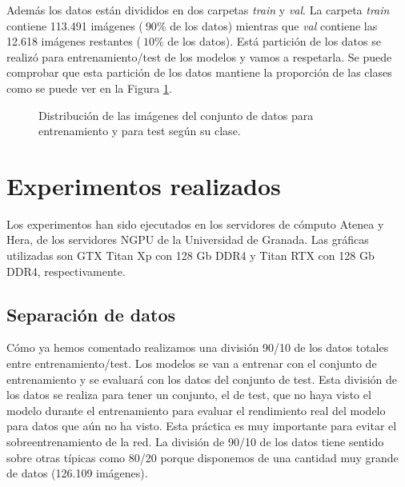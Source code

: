 Además los datos están divididos en dos carpetas \textit{train} y \textit{val}. La carpeta \textit{train} contiene 113.491 imágenes ($~90\%$ de los datos) mientras que \textit{val} contiene las 12.618 imágenes restantes ($~10\%$ de los datos). Está partición de los datos se realizó para entrenamiento/test de los modelos y vamos a respetarla. Se puede comprobar que esta partición de los datos mantiene la proporción de las clases como se puede ver en la Figura \ref{fig:distribucionDatosTrainTest}.


\begin{figure}[h!]
\noindent
{}
\caption{Distribución de las imágenes del conjunto de datos para entrenamiento y para test según su clase.}
\label{fig:distribucionDatosTrainTest}
\end{figure}



\section{Experimentos realizados}

Los experimentos han sido ejecutados en los servidores de cómputo Atenea y Hera, de los servidores NGPU de la Universidad de Granada. Las gráficas utilizadas son GTX Titan Xp con 128 Gb DDR4 y Titan RTX con 128 Gb DDR4, respectivamente.

\subsection{Separación de datos}

Cómo ya hemos comentado realizamos una división 90/10 de los datos totales entre entrenamiento/test. Los modelos se van a entrenar con el conjunto de entrenamiento y se evaluará con los datos del conjunto de test. Esta división de los datos se realiza para tener un conjunto,
el de test, que no haya visto el modelo durante el entrenamiento para evaluar el rendimiento
real del modelo para datos que aún no ha visto. Esta práctica es muy importante para evitar
el sobreentrenamiento de la red. La división de 90/10 de los datos tiene sentido sobre otras típicas como 80/20 porque disponemos de una cantidad muy grande de datos (126.109 imágenes).


